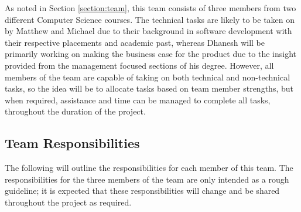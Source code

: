 \documentclass{article}
\begin{document}
As noted in Section \ref{section:team}, this team consists of three members from two different Computer Science courses. The technical tasks are likely to be taken on by Matthew and Michael due to their background in software development with their respective placements and academic past, whereas Dhanesh will be primarily working on making the business case for the product due to the insight provided from the management focused sections of his degree. However, all members of the team are capable of taking on both technical and non-technical tasks, so the idea will be to allocate tasks based on team member strengths, but when required, assistance and time can be managed to complete all tasks, throughout the duration of the project.

\subsection{Team Responsibilities}
The following will outline the responsibilities for each member of this team. The responsibilities for the three members of the team are only intended as a rough guideline; it is expected that these responsibilities will change and be shared throughout the project as required.
\end{document}
